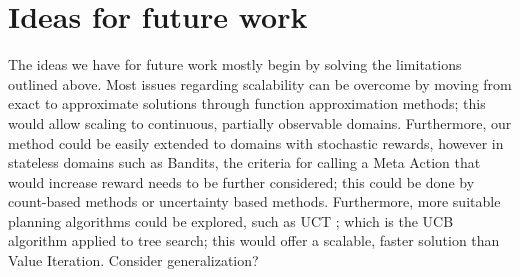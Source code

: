 \section{Ideas for future work}
The ideas we have for future work mostly begin by solving the limitations outlined above. Most issues regarding scalability can be overcome by moving from exact to approximate solutions through function approximation methods; this would allow scaling to continuous, partially  observable domains. Furthermore, our method could be easily extended to domains with stochastic rewards, however in stateless domains such as Bandits, the criteria for calling a Meta Action that would increase reward needs to be further considered; this could be done by count-based methods or uncertainty based methods. Furthermore, more suitable planning algorithms could be explored, such as UCT \cite{10.1007/11871842_29}; which is the UCB algorithm \cite{auer2002finite} applied to tree search; this would offer a scalable, faster solution than Value Iteration. Consider generalization?